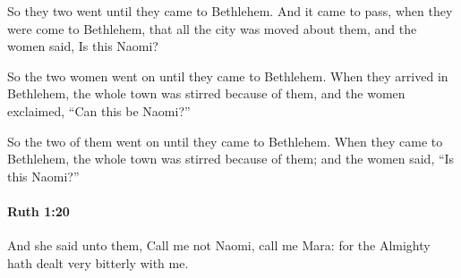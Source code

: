 			\begin{versebox}
					\item[BHS] 
					\item[LXX] 
					\item[ASV] So they two went until they came to Bethlehem. And it came to pass, when they were come to Bethlehem, that all the city was moved about them, and the women said, Is this Naomi?
					\item[NIV] So the two women went on until they came to Bethlehem. When they arrived in Bethlehem, the whole town was stirred because of them, and the women exclaimed, “Can this be Naomi?”
					\item[NRSV] So the two of them went on until they came to Bethlehem. When they came to Bethlehem, the whole town was stirred because of them; and the women said, “Is this Naomi?”
			\end{versebox}

		\paragraph{Ruth 1:20} %
			\label{RUTH-1-20}

			And she said unto them, Call me not Naomi, call me Mara: for the Almighty hath dealt very bitterly with me.

